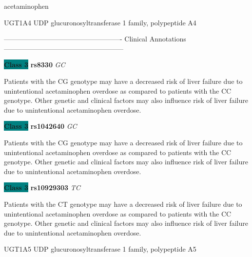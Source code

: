 \documentclass{resume} %
\begin{document}
\begin{rSection}{ acetaminophen }
\begin{rSubsection}{ UGT1A4 }{ UDP glucuronosyltransferase 1 family, polypeptide A4 }{}{}
\item[] ---------------------------------------------------- Clinical Annotations -----------------------------------------------------\newline
\item \textbf{\colorbox{teal} {Class 3}} \textbf{ rs8330 } \textit{ GC }
\item[] Patients with the CG genotype may have a decreased risk of liver failure due to unintentional acetaminophen overdose as compared to patients with the CC genotype. Other genetic and clinical factors may also influence risk of liver failure due to unintentional acetaminophen overdose.\item \textbf{\colorbox{teal} {Class 3}} \textbf{ rs1042640 } \textit{ GC }
\item[] Patients with the CG genotype may have a decreased risk of liver failure due to unintentional acetaminophen overdose as compared to patients with the CC genotype. Other genetic and clinical factors may also influence risk of liver failure due to unintentional acetaminophen overdose.\item \textbf{\colorbox{teal} {Class 3}} \textbf{ rs10929303 } \textit{ TC }
\item[] Patients with the CT genotype may have a decreased risk of liver failure due to unintentional acetaminophen overdose as compared to patients with the CC genotype. Other genetic and clinical factors may also influence risk of liver failure due to unintentional acetaminophen overdose.
\end{rSubsection}\begin{rSubsection}{ UGT1A5 }{ UDP glucuronosyltransferase 1 family, polypeptide A5 }{}{}
\item[]


\end{rSubsection}
\end{rSection}
\end{document}
